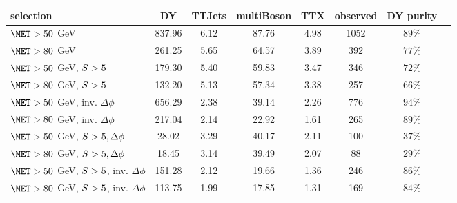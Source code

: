 \begin{tabular}{l|ccccccc} 
  selection & DY&TTJets&multiBoson&TTX&observed&DY purity \\ 
  \hline 
  $\met > 50$ GeV & 837.96 & 6.12 & 87.76 & 4.98 & 1052&                                         $89\%$\\ %
  $\met > 80$ GeV & 261.25 & 5.65 & 64.57 & 3.89 & 392&                                          $77\%$\\ %
  $\met > 50$ GeV, $S > 5$ & 179.30 & 5.40 & 59.83 & 3.47 & 346&                           $72\%$\\ %
  $\met > 80$ GeV, $S > 5$ & 132.20 & 5.13 & 57.34 & 3.38 & 257&                           $66\%$\\ %
  $\met > 50$ GeV, inv. $\Delta\phi$ & 656.29 & 2.38 & 39.14 & 2.26 & 776&                       $94\%$\\ %
  $\met > 80$ GeV, inv. $\Delta\phi$ & 217.04 & 2.14 & 22.92 & 1.61 & 265&                       $89\%$\\ %
  $\met > 50$ GeV, $S > 5, \Delta\phi$ & 28.02 & 3.29 & 40.17 & 2.11 & 100&                $37\%$\\ %
  $\met > 80$ GeV, $S > 5, \Delta\phi$ & 18.45 & 3.14 & 39.49 & 2.07 & 88&                 $29\%$\\ %
  $\met > 50$ GeV, $S > 5$, inv. $\Delta\phi$ & 151.28 & 2.12 & 19.66 & 1.36 & 246&        $86\%$\\ %
  $\met > 80$ GeV, $S > 5$, inv. $\Delta\phi$ & 113.75 & 1.99 & 17.85 & 1.31 & 169&        $84\%$\\ %
\end{tabular} 
